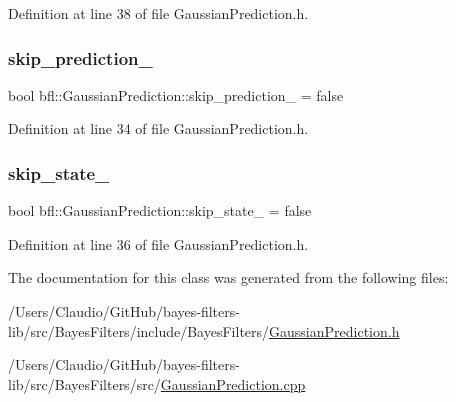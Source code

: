 Definition at line 38 of file Gaussian\+Prediction.\+h.

\mbox{\label{classbfl_1_1GaussianPrediction_a957fc640d2737bf98107ab59b5a4afbf}} 
\subsubsection{\texorpdfstring{skip\+\_\+prediction\+\_\+}{skip\_prediction\_}}
{\footnotesize\ttfamily bool bfl\+::\+Gaussian\+Prediction\+::skip\+\_\+prediction\+\_\+ = false\hspace{0.3cm}{\ttfamily [private]}}



Definition at line 34 of file Gaussian\+Prediction.\+h.

\mbox{\label{classbfl_1_1GaussianPrediction_a666cc032dab917985809e2851b0af743}} 
\subsubsection{\texorpdfstring{skip\+\_\+state\+\_\+}{skip\_state\_}}
{\footnotesize\ttfamily bool bfl\+::\+Gaussian\+Prediction\+::skip\+\_\+state\+\_\+ = false\hspace{0.3cm}{\ttfamily [private]}}



Definition at line 36 of file Gaussian\+Prediction.\+h.



The documentation for this class was generated from the following files\+:\begin{DoxyCompactItemize}
\item 
/\+Users/\+Claudio/\+Git\+Hub/bayes-\/filters-\/lib/src/\+Bayes\+Filters/include/\+Bayes\+Filters/\mbox{\hyperlink{GaussianPrediction_8h}{Gaussian\+Prediction.\+h}}\item 
/\+Users/\+Claudio/\+Git\+Hub/bayes-\/filters-\/lib/src/\+Bayes\+Filters/src/\mbox{\hyperlink{GaussianPrediction_8cpp}{Gaussian\+Prediction.\+cpp}}\end{DoxyCompactItemize}
